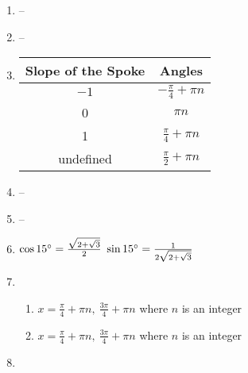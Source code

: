 \documentclass{article}
\begin{document}
\begin{enumerate}
\begin{enumerate}
	\end{enumerate}

\item --

\item --

\item 

	\begin{tabular}{| c | c |}
	
	\hline
	
	Slope of the Spoke & Angles \\
	
	\hline
	
	$-1$ & $-\frac{\pi}{4} + \pi n$ \\
	
	\hline
	
	0 & $\pi n$ \\
	
	\hline
	
	1 & $\frac{\pi}{4} + \pi n$ \\
	
	\hline
	
	undefined & $\frac{\pi}{2} + \pi n$ \\
	
	\hline
	
	\end{tabular}
	
\item --

\item --

\item $\cos{15\degree} = \frac{\sqrt{2 + \sqrt{3}}}{2}$ \newline
	\newline
	$\sin{15\degree} = \frac{1}{2 \sqrt{2 + \sqrt{3}}}$
	
\item

	\begin{enumerate}
	
	\item $x = \frac{\pi}{4} + \pi n, \ \frac{3\pi}{4} + \pi n$ where $n$ is an integer
	
	\item $x = \frac{\pi}{4} + \pi n, \ \frac{3\pi}{4} + \pi n$ where $n$ is an integer
	
	\end{enumerate}
	
\item 


\end{enumerate}
\end{document}
